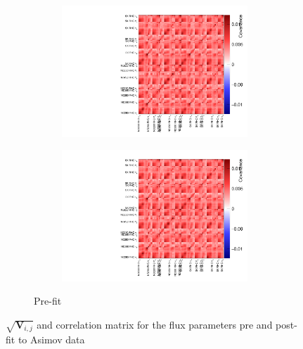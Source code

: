 \begin{figure}[h]
	\begin{subfigure}[t]{\textwidth}
		\begin{subfigure}[t]{0.49\textwidth}
			\includegraphics[width=\textwidth, trim={0mm 0mm 0mm 0mm}, clip,page=2]{figures/mach3/inputs/flux_covariance_banff_13av2.pdf}
		\end{subfigure}
		\begin{subfigure}[t]{0.49\textwidth}
			\includegraphics[width=\textwidth, trim={0mm 0mm 0mm 0mm}, clip,page=3]{figures/mach3/inputs/flux_covariance_banff_13av2.pdf}
		\end{subfigure}
		\caption{Pre-fit}
	\end{subfigure}
	\caption{$\sqrt{\mathbf{V}_{i,j}}$ and correlation matrix for the flux parameters pre and post-fit to Asimov data}
	\label{fig:asimov_flux_corr_2018}
\end{figure}

